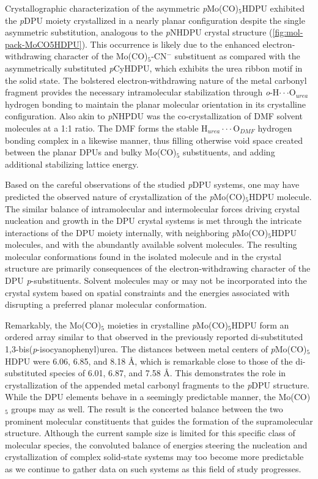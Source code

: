 Crystallographic characterization of the asymmetric \textit{p}Mo(CO)$_{5}$HDPU exhibited the \textit{p}DPU moiety crystallized in a nearly planar configuration despite the single asymmetric substitution, analogous to the \textit{p}NHDPU crystal structure (\autoref{fig:mol-pack-MoCO5HDPU}). This occurrence is likely due to the enhanced electron-withdrawing character of the Mo(CO)$_{5}$-CN$^{-}$ substituent as compared with the asymmetrically substituted \textit{p}CyHDPU, which exhibits the urea ribbon motif in the solid state. The bolstered electron-withdrawing nature of the metal carbonyl fragment provides the necessary intramolecular stabilization through \textit{o}-H$\cdot \cdot \cdot$O$_{urea}$ hydrogen bonding to maintain the planar molecular orientation in its crystalline configuration. Also akin to \textit{p}NHPDU was the co-crystallization of DMF solvent molecules at a 1:1 ratio. The DMF forms the stable H$_{urea}\cdot \cdot \cdot$O$_{DMF}$ hydrogen bonding complex in a likewise manner, thus filling otherwise void space created between the planar DPUs and bulky Mo(CO)$_{5}$ substituents, and adding additional stabilizing lattice energy. 

Based on the careful observations of the studied \textit{p}DPU systems, one may have predicted the observed nature of crystallization of the \textit{p}Mo(CO)$_{5}$HDPU molecule. The similar balance of intramolecular and intermolecular forces driving crystal nucleation and growth in the DPU crystal systems is met through the intricate interactions of the DPU moiety internally, with neighboring \textit{p}Mo(CO)$_{5}$HDPU molecules, and with the abundantly available solvent molecules. The resulting molecular conformations found in the isolated molecule and in the crystal structure are primarily consequences of the electron-withdrawing character of the DPU \textit{p}-substituents. Solvent molecules may or may not be incorporated into the crystal system based on spatial constraints and the energies associated with disrupting a preferred planar molecular conformation.

Remarkably, the Mo(CO)$_{5}$ moieties in crystalline \textit{p}Mo(CO)$_{5}$HDPU form an ordered array similar to that observed in the previously reported di-substituted 1,3-bis(\textit{p}-isocyanophenyl)urea. The distances between metal centers of \textit{p}Mo(CO)$_{5}$HDPU were 6.06, 6.85, and 8.18 \AA, which is remarkable close to those of the di-substituted species of 6.01, 6.87, and 7.58 \AA. This demonstrates the role in crystallization of the appended metal carbonyl fragments to the \textit{p}DPU structure. While the DPU elements behave in a seemingly predictable manner, the Mo(CO)$_{5}$ groups may as well. The result is the concerted balance between the two prominent molecular constituents that guides the formation of the supramolecular structure. Although the current sample size is limited for this specific class of molecular species, the convoluted balance of energies steering the nucleation and crystallization of complex solid-state systems may too become more predictable as we continue to gather data on such systems as this field of study progresses. 

